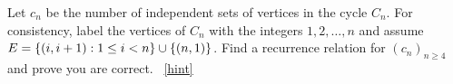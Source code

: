 \documentclass{book}
\begin{document}
\setcounter{project}{140}
\addtocounter{project}{-1}
\begin{activity}[]\label{activity-133}
\hypertarget{p-952}{}%
Let \(c_n\) be the number of independent sets of vertices in the cycle \(C_n\).  For consistency, label the vertices of \(C_n\) with the integers \(1, 2, \ldots, n\) and assume \(E = \{(i, i+1) : 1 \le i < n\} \cup \{(n, 1)\}\). Find a recurrence relation for \((c_n)_{n\ge 4}\) and prove you are correct.%
~\hfill{\tiny\hyperlink{a-140}{[hint]}\hypertarget{q-140}{}}\end{activity}
\end{document}
